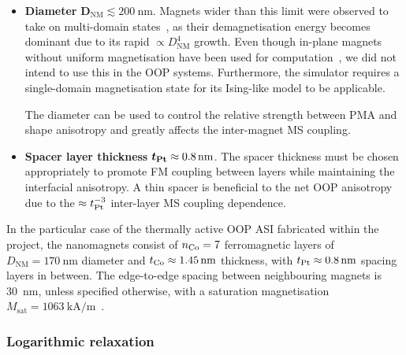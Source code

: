 \begin{itemize}
	\item \textbf{Diameter} $\boldsymbol{D_\mathrm{NM}} \lesssim \SI{200}{\nano\metre}$. \newline
	Magnets wider than this limit were observed to take on multi-domain states~\cite{KUR-24}, as their demagnetisation energy becomes dominant due to its rapid $\propto D_\mathrm{NM}^4$ growth.
	Even though in-plane magnets without uniform magnetisation have been used for computation~\cite{gartside2022reconfigurable}, we did not intend to use this in the OOP systems.
	Furthermore, the \hotspice simulator requires a single-domain magnetisation state for its Ising-like model to be applicable. \par
	The diameter can be used to control the relative strength between PMA and shape anisotropy and greatly affects the inter-magnet MS coupling.
	\item \textbf{Spacer layer thickness} $\boldsymbol{t_{\ce{Pt}}} \approx \SI{0.8}{\nano\metre}$. \newline
	The spacer thickness must be chosen appropriately to promote FM coupling between layers while maintaining the interfacial anisotropy. %
	A thin spacer is beneficial to the net OOP anisotropy due to the $\approx t_{\ce{Pt}}^{-3}$ inter-layer MS coupling dependence.
\end{itemize}

In the particular case of the thermally active OOP ASI fabricated within the \spinengine project, the nanomagnets consist of $n_{\ce{Co}}=7$ ferromagnetic layers of $D_\mathrm{NM}=\SI{170}{\nano\metre}$ diameter and $t_{\ce{Co}} \approx \SI{1.45}{\nano\metre}$ thickness, with $t_{\ce{Pt}} \approx \SI{0.8}{\nano\metre}$ spacing layers in between.
The edge-to-edge spacing between neighbouring magnets is \SI{30}{\nano\metre}, unless specified otherwise, with a saturation magnetisation $M_\mathrm{sat}=\SI{1063}{\kilo\ampere\per\metre}$~\cite{Msat_Co}.

\subsubsection{Logarithmic relaxation}
